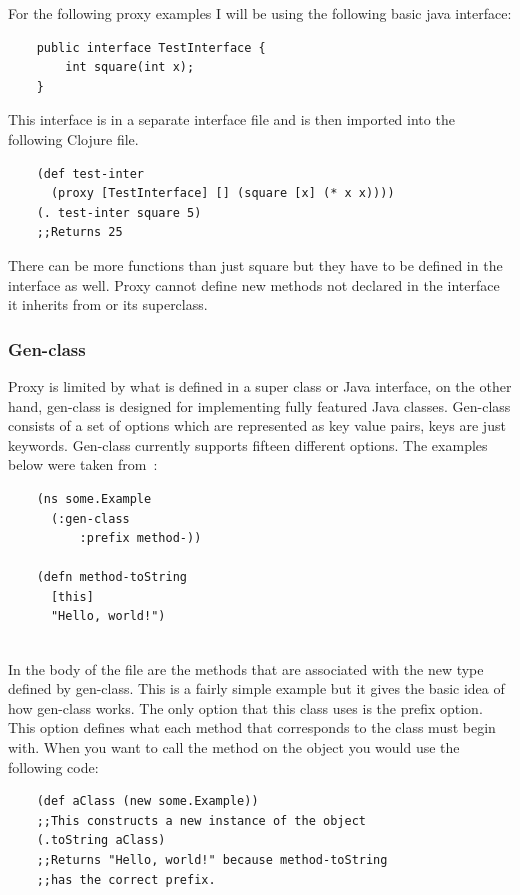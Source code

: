 \documentclass[12pt]{article}
\begin{document}
	For the following proxy examples I will be using the following basic java interface:
	
	\begin{verbatim}
	public interface TestInterface {
		int square(int x);
	}
	\end{verbatim}
	This interface is in a separate interface file and is then imported into the following Clojure file.
	\begin{verbatim}
	(def test-inter 
	  (proxy [TestInterface] [] (square [x] (* x x))))
	(. test-inter square 5)
	;;Returns 25
	\end{verbatim}
	There can be more functions than just square but they have to be defined in the interface as well. Proxy cannot define new methods not declared in the interface it inherits from or its superclass.
	
	\subsubsection{Gen-class}
	Proxy is limited by what is defined in a super class or Java interface, on the other hand, gen-class is designed for implementing fully featured Java classes. Gen-class consists of a set of options which are represented as key value pairs, keys are just keywords. Gen-class currently supports fifteen different options. The examples below were taken from~\cite{kotka}:
	
	\newpage
	\begin{verbatim}
	(ns some.Example
	  (:gen-class 
	      :prefix method-))
	  
	(defn method-toString
	  [this]
	  "Hello, world!")
	  
	\end{verbatim}
	
	In the body of the file are the methods that are associated with the new type defined by gen-class. This is a fairly simple example but it gives the basic idea of how gen-class works. The only option that this class uses is the prefix option. This option defines what each method that corresponds to the class must begin with. When you want to call the method on the object you would use the following code:
	
	\begin{verbatim}
	(def aClass (new some.Example))
	;;This constructs a new instance of the object
	(.toString aClass)
	;;Returns "Hello, world!" because method-toString 
	;;has the correct prefix.
	\end{verbatim}
	
\end{document}
